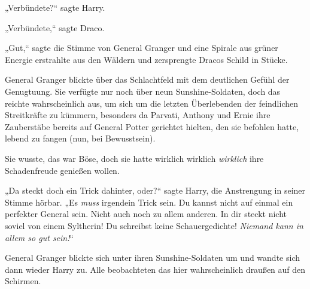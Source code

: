 „Verbündete?“ sagte Harry.

„Verbündete,“ sagte Draco.

„Gut,“ sagte die Stimme von General Granger und eine Spirale aus grüner Energie erstrahlte aus den Wäldern und zersprengte Dracos Schild in Stücke.

\later

General Granger blickte über das Schlachtfeld mit dem deutlichen Gefühl der Genugtuung. Sie verfügte nur noch über neun Sunshine-Soldaten, doch das reichte wahrscheinlich aus, um sich um die letzten Überlebenden der feindlichen Streitkräfte zu kümmern, besonders da Parvati, Anthony und Ernie ihre Zauberstäbe bereits auf General Potter gerichtet hielten, den sie befohlen hatte, lebend zu fangen (nun, bei Bewusstsein).

Sie wusste, das war Böse, doch sie hatte wirklich wirklich \emph{wirklich} ihre Schadenfreude genießen wollen.

„Da steckt doch ein Trick dahinter, oder?“ sagte Harry, die Anstrengung in seiner Stimme hörbar. „Es \emph{muss} irgendein Trick sein. Du kannst nicht auf einmal ein perfekter General sein. Nicht auch noch zu allem anderen. In dir steckt nicht soviel von einem Syltherin! Du schreibst keine Schauergedichte! \emph{Niemand kann in allem so gut sein!}“

General Granger blickte sich unter ihren Sunshine-Soldaten um und wandte sich dann wieder Harry zu. Alle beobachteten das hier wahrscheinlich draußen auf den Schirmen.

